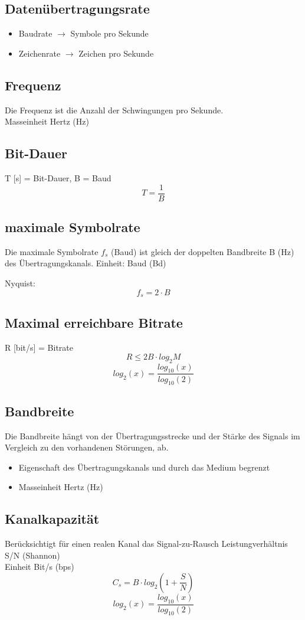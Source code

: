 \columnbreak
\subsection{Datenübertragungsrate}{
    \begin{itemize}[noitemsep]
        \item Baudrate $\to$ Symbole pro Sekunde
        \item Zeichenrate $\to$ Zeichen pro Sekunde
    \end{itemize}
}

\subsection{Frequenz}{
    {Die Frequenz ist die Anzahl der Schwingungen pro Sekunde.\\
            Masseinheit Hertz (Hz)\\}
}

\subsection{Bit-Dauer }
{  T [s] = Bit-Dauer, B = Baud \\}
$$ T = \frac{1}{B}$$


\subsection{maximale Symbolrate}
{    Die maximale Symbolrate $f_s$ (Baud) ist gleich der doppelten Bandbreite B (Hz) des
    Übertragungskanals.
}
{Einheit: Baud (Bd)}

{Nyquist:}
$$ f_s = 2 \cdot B$$

\subsection{Maximal erreichbare Bitrate}{
R [bit/s] = Bitrate \\
$$ R \leq 2B \cdot log_2{M} $$
$$ log_2(x) = \frac{log_{10}(x)}{log_{10}(2)} $$
}



\subsection{Bandbreite}{
    Die Bandbreite hängt von der Übertragungsstrecke und der Stärke des Signals im
    Vergleich zu den vorhandenen Störungen, ab.
    \begin{itemize}[noitemsep]
        \item Eigenschaft des Übertragungskanals und durch das Medium begrenzt
        \item Masseinheit Hertz (Hz)
    \end{itemize}
}

\subsection{Kanalkapazität}{
    Berücksichtigt für einen realen Kanal das Signal-zu-Rausch Leistungverhältnis S/N (Shannon)
    \\ Einheit Bit/s (bps)
    $$ C_s = B \cdot log_2(1 + \frac{S}{N})$$
    $$ log_2(x) = \frac{log_{10}(x)}{log_{10}(2)} $$
}
